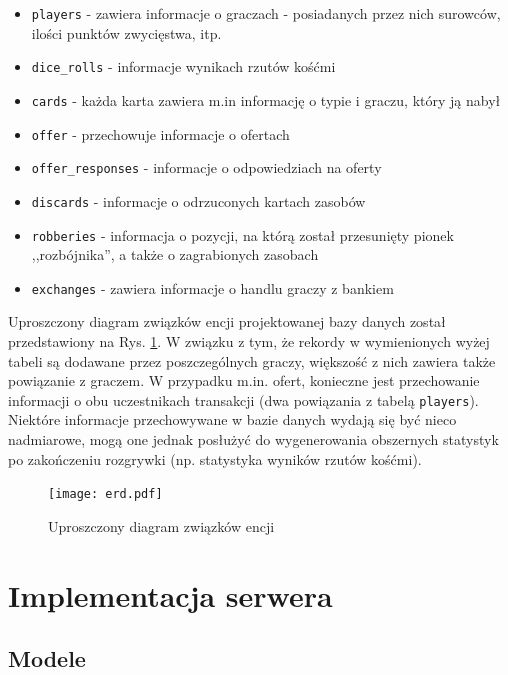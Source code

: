 \documentclass[a4paper,12pt]{article}
\providecommand{\imref}[1]{Rys. \ref{#1}} %
\begin{document}
\begin{itemize}
\item \texttt{players} - zawiera informacje o graczach -
  posiadanych przez nich surowców, ilości punktów zwycięstwa, itp.
\item \texttt{dice\_rolls} - informacje wynikach rzutów
  kośćmi
\item \texttt{cards} - każda karta zawiera m.in informację o typie i
  graczu, który ją nabył
\item \texttt{offer} - przechowuje informacje o ofertach
\item \texttt{offer\_responses} - informacje o odpowiedziach na oferty
\item \texttt{discards} - informacje o odrzuconych kartach zasobów
\item \texttt{robberies} - informacja o pozycji, na którą został
  przesunięty pionek ,,rozbójnika'', a także o zagrabionych zasobach
\item \texttt{exchanges} - zawiera informacje o handlu graczy z
  bankiem
\end{itemize}

Uproszczony diagram związków encji projektowanej bazy danych został
przedstawiony na \imref{erd}. W związku z tym, że rekordy w
wymienionych wyżej tabeli są dodawane przez poszczególnych graczy,
większość z nich zawiera także powiązanie z graczem. W przypadku
m.in. ofert, konieczne jest przechowanie informacji o obu uczestnikach
transakcji (dwa powiązania z tabelą \texttt{players}). Niektóre
informacje przechowywane w bazie danych wydają się być nieco
nadmiarowe, mogą one jednak posłużyć do wygenerowania obszernych
statystyk po zakończeniu rozgrywki (np. statystyka wyników rzutów
kośćmi).

\begin{figure}[ht]
  \begin{center}
    \texttt{[image: erd.pdf]}
  \end{center}
  \caption{Uproszczony diagram związków encji}
  \label{erd}
\end{figure}

\clearpage

\section{Implementacja serwera}

\subsection{Modele}
\end{document}
